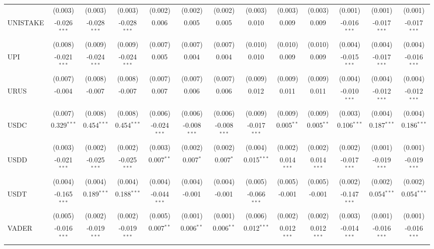 \begin{table}[!htbp]
\begin{tabular}{@{\extracolsep{5pt}}lcccccccccccc}
  & (0.003) & (0.003) & (0.003) & (0.002) & (0.002) & (0.002) & (0.003) & (0.003) & (0.003) & (0.001) & (0.001) & (0.001) \\
 UNISTAKE & -0.026$^{***}$ & -0.028$^{***}$ & -0.028$^{***}$ & 0.006$^{}$ & 0.005$^{}$ & 0.005$^{}$ & 0.010$^{}$ & 0.009$^{}$ & 0.009$^{}$ & -0.016$^{***}$ & -0.017$^{***}$ & -0.017$^{***}$ \\
  & (0.008) & (0.009) & (0.009) & (0.007) & (0.007) & (0.007) & (0.010) & (0.010) & (0.010) & (0.004) & (0.004) & (0.004) \\
 UPI & -0.021$^{***}$ & -0.024$^{***}$ & -0.024$^{***}$ & 0.005$^{}$ & 0.004$^{}$ & 0.004$^{}$ & 0.010$^{}$ & 0.009$^{}$ & 0.009$^{}$ & -0.015$^{***}$ & -0.017$^{***}$ & -0.016$^{***}$ \\
  & (0.007) & (0.008) & (0.008) & (0.007) & (0.007) & (0.007) & (0.009) & (0.009) & (0.009) & (0.004) & (0.004) & (0.004) \\
 URUS & -0.004$^{}$ & -0.007$^{}$ & -0.007$^{}$ & 0.007$^{}$ & 0.006$^{}$ & 0.006$^{}$ & 0.012$^{}$ & 0.011$^{}$ & 0.011$^{}$ & -0.010$^{***}$ & -0.012$^{***}$ & -0.012$^{***}$ \\
  & (0.007) & (0.008) & (0.008) & (0.006) & (0.006) & (0.006) & (0.009) & (0.009) & (0.009) & (0.003) & (0.004) & (0.004) \\
 USDC & 0.329$^{***}$ & 0.454$^{***}$ & 0.454$^{***}$ & -0.024$^{***}$ & -0.008$^{***}$ & -0.008$^{***}$ & -0.017$^{***}$ & 0.005$^{**}$ & 0.005$^{**}$ & 0.106$^{***}$ & 0.187$^{***}$ & 0.186$^{***}$ \\
  & (0.003) & (0.002) & (0.002) & (0.003) & (0.002) & (0.002) & (0.004) & (0.002) & (0.002) & (0.002) & (0.001) & (0.001) \\
 USDD & -0.021$^{***}$ & -0.025$^{***}$ & -0.025$^{***}$ & 0.007$^{**}$ & 0.007$^{*}$ & 0.007$^{*}$ & 0.015$^{***}$ & 0.014$^{***}$ & 0.014$^{***}$ & -0.017$^{***}$ & -0.019$^{***}$ & -0.019$^{***}$ \\
  & (0.004) & (0.004) & (0.004) & (0.004) & (0.004) & (0.004) & (0.005) & (0.005) & (0.005) & (0.002) & (0.002) & (0.002) \\
 USDT & -0.165$^{***}$ & 0.189$^{***}$ & 0.188$^{***}$ & -0.044$^{***}$ & -0.001$^{}$ & -0.001$^{}$ & -0.066$^{***}$ & -0.001$^{}$ & -0.001$^{}$ & -0.147$^{***}$ & 0.054$^{***}$ & 0.054$^{***}$ \\
  & (0.005) & (0.002) & (0.002) & (0.005) & (0.001) & (0.001) & (0.006) & (0.002) & (0.002) & (0.003) & (0.001) & (0.001) \\
 VADER & -0.016$^{***}$ & -0.019$^{***}$ & -0.019$^{***}$ & 0.007$^{**}$ & 0.006$^{**}$ & 0.006$^{**}$ & 0.012$^{***}$ & 0.012$^{***}$ & 0.012$^{***}$ & -0.014$^{***}$ & -0.016$^{***}$ & -0.016$^{***}$ \\

\end{tabular}
\end{table}
